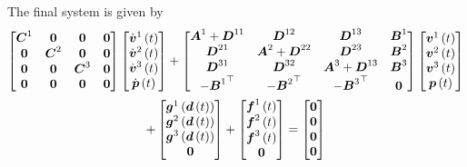The final system is given by
\begin{multline}
  \begin{bmatrix}
    \matr{C}^{1} & \matr{0} & \matr{0} & \matr{0} \\
    \matr{0} & \matr{C}^{2} & \matr{0} & \matr{0} \\
    \matr{0} & \matr{0} & \matr{C}^{3} & \matr{0} \\
    \matr{0} & \matr{0} & \matr{0} & \matr{0}
  \end{bmatrix}\begin{bmatrix}
      \fnof{\dot{\vectr{v}}^{1}}{t} \\
      \fnof{\dot{\vectr{v}}^{2}}{t} \\
      \fnof{\dot{\vectr{v}}^{3}}{t} \\
      \fnof{\dot{\vectr{p}}}{t}
  \end{bmatrix}+\begin{bmatrix}
     \matr{A}^{1}+\matr{D}^{11} & \matr{D}^{12} & \matr{D}^{13} & \matr{B}^{1}\\
     \matr{D}^{21} & \matr{A}^{2}+\matr{D}^{22} & \matr{D}^{23} & \matr{B}^{2}\\
     \matr{D}^{31} & \matr{D}^{32} & \matr{A}^{3}+\matr{D}^{13} & \matr{B}^{3}\\
     -\transpose{\matr{B}^{1}} & -\transpose{\matr{B}^{2}} & -\transpose{\matr{B}^{3}} & \matr{0}
  \end{bmatrix}\begin{bmatrix}
    \fnof{\vectr{v}^{1}}{t} \\
    \fnof{\vectr{v}^{2}}{t} \\
    \fnof{\vectr{v}^{3}}{t} \\
    \fnof{\vectr{p}}{t}
  \end{bmatrix}\\
  +\begin{bmatrix}
    \fnof{\vectr{g}^{1}}{\fnof{\vectr{d}}{t}} \\
    \fnof{\vectr{g}^{2}}{\fnof{\vectr{d}}{t}} \\
    \fnof{\vectr{g}^{3}}{\fnof{\vectr{d}}{t}} \\
    \vectr{0}
  \end{bmatrix}+\begin{bmatrix}
    \fnof{\vectr{f}^{1}}{t} \\
    \fnof{\vectr{f}^{2}}{t} \\
    \fnof{\vectr{f}^{3}}{t} \\
    \vectr{0}
  \end{bmatrix}=\begin{bmatrix}
  \vectr{0} \\
  \vectr{0} \\
  \vectr{0} \\
  \vectr{0}
  \end{bmatrix}
\end{multline}


